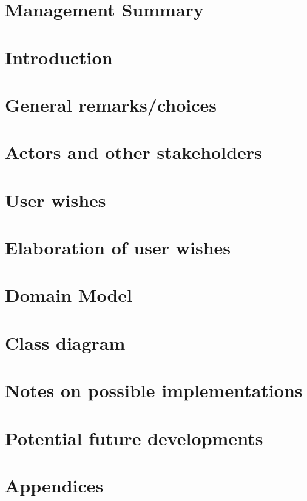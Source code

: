 \documentclass[11pt]{article}
\begin{document}
\tableofcontents
\newpage

\section{Management Summary}


\section{Introduction}


\section{General remarks/choices}

\newpage

\section{Actors and other stakeholders}


\section{User wishes}

\newpage

\section{Elaboration of user wishes}

\newpage

\section{Domain Model}

\newpage

\section{Class diagram}


\section{Notes on possible implementations}

\section{Potential future developments}

\section{Appendices}

\end{document}
